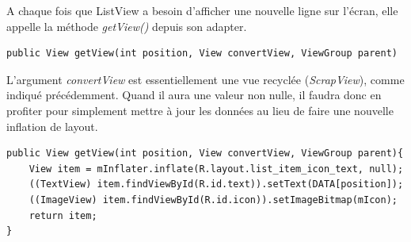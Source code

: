 A chaque fois que ListView a besoin d’afficher une nouvelle ligne sur l’écran, elle appelle la méthode \emph{getView()} depuis son adapter.

\begin{adjustbox}{minipage=1.12\textwidth,margin=0pt \smallskipamount,center}
\begin{lstlisting}[style=Java, label=listview1]
public View getView(int position, View convertView, ViewGroup parent)
\end{lstlisting}
\end{adjustbox}

L’argument \emph{convertView} est essentiellement une vue recyclée (\emph{ScrapView}), comme indiqué précédemment. Quand il aura une valeur non nulle, il faudra donc en profiter pour simplement mettre à jour les données au lieu de faire une nouvelle inflation de layout.

\begin{adjustbox}{minipage=1.14\textwidth,margin=0pt \smallskipamount,center}
\begin{lstlisting}[style=Java, label=listview2]
public View getView(int position, View convertView, ViewGroup parent){ 
	View item = mInflater.inflate(R.layout.list_item_icon_text, null);
	((TextView) item.findViewById(R.id.text)).setText(DATA[position]); 
	((ImageView) item.findViewById(R.id.icon)).setImageBitmap(mIcon);
	return item; 
}
\end{lstlisting}
\end{adjustbox}
